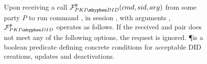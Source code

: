 \begin{figure}
  \begin{framed}
    \begin{minipage}[t]{\textwidth}
      \textrm{Upon receiving a call $\IdealFPKIDID^{\P}(\cmd,\sid,\arg)$
        from some party $P$ to run command \cmd, in session \sid, with arguments
        \arg, $\IdealFPKIDID^{\P}$ operates as follows.}
      \textrm{If the received \cmd and \arg pair does not meet any of
        the following options, the request is ignored.}
      \textrm{\P is a boolean predicate defining concrete conditions for
        acceptable DID creations, updates and deactivations.
      }
      \textrm{}
    \end{minipage}
    \vspace*{0.5em}
    

\end{framed}
\end{figure}

